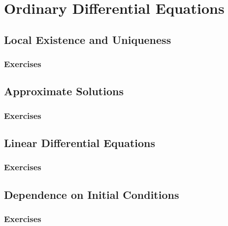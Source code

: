 \setcounter{chapter}{0}
\renewcommand{\thechapter}{19}
\chapter{Ordinary Differential Equations}\label{ch:19}
\setcounter{equation}{0}	        %

\section{Local Existence and Uniqueness}\label{sec:19.1}
\subsection*{Exercises}\label{sec:19.1_Exercises}
\section{Approximate Solutions}\label{sec:19.2}	
\subsection*{Exercises}\label{sec:19.2_Exercises}
\section{Linear Differential Equations}\label{sec:19.3}	
\subsection*{Exercises}\label{sec:19.3_Exercises}
\section{Dependence on Initial Conditions}\label{sec:19.4}	
\subsection*{Exercises}\label{sec:19.4_Exercises}
